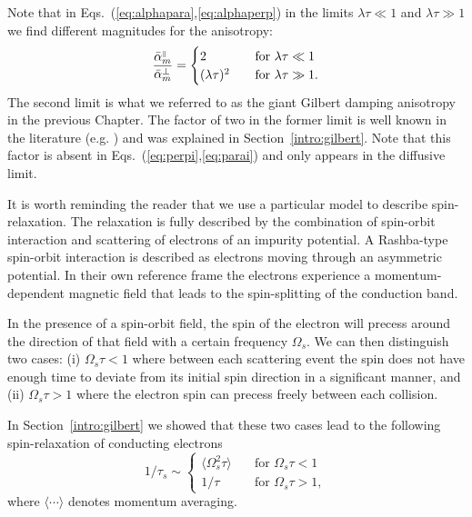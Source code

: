 Note that in Eqs.~(\ref{eq:alphapara},\ref{eq:alphaperp}) in the limits $\lambda\tau\ll 1$ and $\lambda\tau\gg1$ we find different magnitudes for the anisotropy:
\begin{equation}
	\frac{\bar{\alpha}_m^{{\scriptscriptstyle\parallel}}}{\bar{\alpha}_m^{\perp}} = \begin{cases}
    	2 
        	& \quad \text{for } \lambda\tau\ll 1\\
        (\lambda\tau)^2
        	& \quad \text{for } \lambda\tau\gg 1.
    \end{cases}
\end{equation}
The second limit is what we referred to as the giant Gilbert damping anisotropy in the previous Chapter. The factor of two in the former limit is well known in the literature (e.g. \cite{DYAKONOV1986, aronov_spin_1983, averkiev_spin_2002, burkov_theory_2004}) and was explained in Section~\ref{intro:gilbert}. Note that this factor is absent in Eqs.~(\ref{eq:perpi},\ref{eq:parai}) and only appears in the diffusive limit. 

It is worth reminding the reader that we use a particular model to describe spin-relaxation. The relaxation is fully described by the combination of spin-orbit interaction and scattering of electrons of an impurity potential. A Rashba-type spin-orbit interaction is described as electrons moving through an asymmetric potential. In their own reference frame the electrons experience a momentum-dependent magnetic field that leads to the spin-splitting of the conduction band. 

In the presence of a spin-orbit field, the spin of the electron will precess around the direction of that field with a certain frequency $\Omega_s$. We can then distinguish two cases: (i) $\Omega_s \tau < 1$ where between each scattering event the spin does not have enough time to deviate from its initial spin direction in a significant manner, and (ii) $\Omega_s\tau>1$ where the electron spin can precess freely between each collision. 

In Section~\ref{intro:gilbert} we showed that these two cases lead to the following spin-relaxation of conducting electrons
\begin{equation}
	1/\tau_s \sim \begin{cases}
    	\langle \Omega^2_s\tau\rangle & \quad\text{for  } \Omega_s\tau < 1\\
        1/\tau  &\quad \text{for  }  \Omega_s\tau>1,
    \end{cases}
\end{equation}
where $\langle\cdots\rangle$ denotes momentum averaging. 

